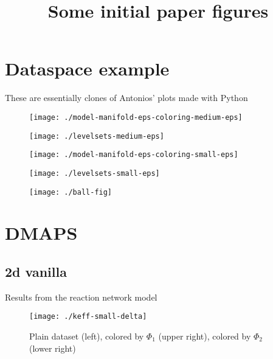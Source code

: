 \documentclass[11pt]{article}
\title{Some initial paper figures}
\author{}
\begin{document}
\maketitle

\section{Dataspace example}

These are essentially clones of Antonios' plots made with Python

\begin{figure}[htbp]
  \centering
  \texttt{[image: ./model-manifold-eps-coloring-medium-eps]}
\end{figure}

\begin{figure}[htbp]
  \centering
  \texttt{[image: ./levelsets-medium-eps]}
\end{figure}

\begin{figure}[htbp]
  \centering
  \texttt{[image: ./model-manifold-eps-coloring-small-eps]}
\end{figure}

\begin{figure}[htbp]
  \centering
  \texttt{[image: ./levelsets-small-eps]}
\end{figure}

\begin{figure}[htbp]
  \centering
  \texttt{[image: ./ball-fig]}
\end{figure}

\clearpage

\section{DMAPS}

\subsection{2d vanilla}

Results from the reaction network model

\begin{figure}[htbp]
  \centering
  \texttt{[image: ./keff-small-delta]}
  \caption{Plain dataset (left), colored by $\Phi_1$ (upper right), colored by $\Phi_2$ (lower right)}
\end{figure}
\end{document}

